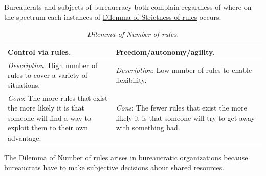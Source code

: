 Bureaucrats and subjects of bureaucracy both complain regardless of where on the spectrum each instances of \href{table:rule-strictness}{Dilemma of Strictness of rules} occurs. 




\begin{center}
\begin{table}[H] %
\begin{tabular}{ | m{\dilemmatablewidth}| m{\dilemmatablewidth} | } 
  \hline
  \textbf{Control via rules.} & \textbf{Freedom/autonomy/agility.} \\ 
  \hline
  \textit{Description}: High number of rules to cover a variety of situations. & 
  \textit{Description}: Low number of rules to enable flexibility. \\ 
  \hline
  \textit{Cons}: The more rules that exist the more likely it is that someone will find a way to exploit them to their own advantage. & 
  \textit{Cons}: The fewer rules that exist the more likely it is that someone will try to get away with something bad. \\  
  \hline
\end{tabular}
\caption{
\textit{Dilemma of Number of rules.}
}
\label{table:number-of-rules}
\end{table}
\end{center}



The \href{table:number-of-rules}{Dilemma of Number of rules}
arises in bureaucratic organizations because bureaucrats have to make subjective decisions about shared resources. 


